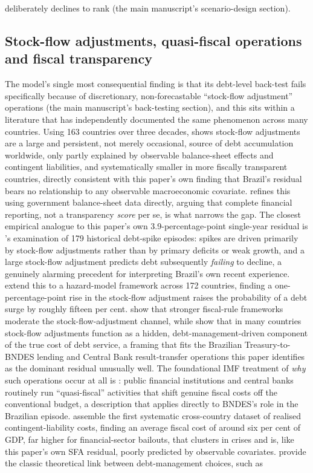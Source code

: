 \documentclass[11pt,a4paper]{article}
\begin{document}
deliberately declines to rank (the main manuscript's scenario-design section).

\subsection{Stock-flow adjustments, quasi-fiscal operations and fiscal transparency}
\label{sec:lit-sfa}

The model's single most consequential finding is that its debt-level back-test fails specifically because of discretionary, non-forecastable ``stock-flow adjustment'' operations (the main manuscript's back-testing section), and this sits within a literature that has independently documented the same phenomenon across many countries. Using 163 countries over three decades, \citet{weber2012sfa} shows stock-flow adjustments are a large and persistent, not merely occasional, source of debt accumulation worldwide, only partly explained by observable balance-sheet effects and contingent liabilities, and systematically smaller in more fiscally transparent countries, directly consistent with this paper's own finding that Brazil's residual bears no relationship to any observable macroeconomic covariate. \citet{seiferling2013} refines this using government balance-sheet data directly, arguing that complete financial reporting, not a transparency \emph{score} per se, is what narrows the gap. The closest empirical analogue to this paper's own 3.9-percentage-point single-year residual is \citet{jaramilloetal2017}'s examination of 179 historical debt-spike episodes: spikes are driven primarily by stock-flow adjustments rather than by primary deficits or weak growth, and a large stock-flow adjustment predicts debt subsequently \emph{failing} to decline, a genuinely alarming precedent for interpreting Brazil's own recent experience. \citet{andrianetal2024sfa} extend this to a hazard-model framework across 172 countries, finding a one-percentage-point rise in the stock-flow adjustment raises the probability of a debt surge by roughly fifteen per cent. \citet{afonsojalles2019sfa} show that stronger fiscal-rule frameworks moderate the stock-flow-adjustment channel, while \citet{casalinetal2023} show that in many countries stock-flow adjustments function as a hidden, debt-management-driven component of the true cost of debt service, a framing that fits the Brazilian Treasury-to-BNDES lending and Central Bank result-transfer operations this paper identifies as the dominant residual unusually well. The foundational IMF treatment of \emph{why} such operations occur at all is \citet{mackenziestella1996}: public financial institutions and central banks routinely run ``quasi-fiscal'' activities that shift genuine fiscal costs off the conventional budget, a description that applies directly to BNDES's role in the Brazilian episode. \citet{bovaetal2016contingent} assemble the first systematic cross-country dataset of realised contingent-liability costs, finding an average fiscal cost of around six per cent of GDP, far higher for financial-sector bailouts, that clusters in crises and is, like this paper's own SFA residual, poorly predicted by observable covariates. \citet{alesinapratitabellini1989} provide the classic theoretical link between debt-management choices, such as 
\end{document}
